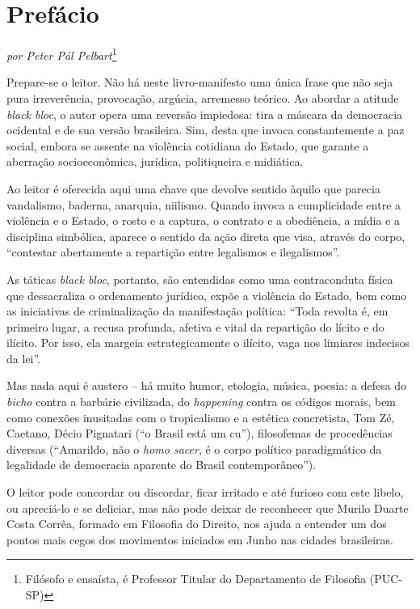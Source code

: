 \chapter{Prefácio}

\begin{flushright}
\emph{por Peter Pál Pelbart}\footnote{Filósofo e ensaísta, é
Professor Titular do Departamento de Filosofia (PUC-SP)}
\end{flushright}

Prepare-se o leitor. Não há neste livro-manifesto uma única frase que
não seja pura irreverência, provocação, argúcia, arremesso teórico. Ao
abordar a atitude \emph{black bloc}, o autor opera uma reversão
impiedosa: tira a máscara da democracia ocidental e de sua versão
brasileira. Sim, desta que invoca constantemente a paz social, embora se
assente na violência cotidiana do Estado, que garante a aberração
socioeconômica, jurídica, politiqueira e midiática.

Ao leitor é oferecida aqui uma chave que devolve sentido àquilo que
parecia vandalismo, baderna, anarquia, niilismo\emph{.} Quando invoca a
cumplicidade entre a violência e o Estado, o rosto e a captura, o
contrato e a obediência, a mídia e a disciplina simbólica, aparece o
sentido da ação direta que visa, através do corpo, ``contestar
abertamente a repartição entre legalismos e ilegalismos''.

As táticas \emph{black bloc}, portanto, são entendidas como uma
contraconduta física que dessacraliza o ordenamento jurídico, expõe a
violência do Estado, bem como as iniciativas de criminalização da
manifestação política: ``Toda revolta é, em primeiro lugar, a recusa
profunda, afetiva e vital da repartição do lícito e do ilícito. Por
isso, ela margeia estrategicamente o ilícito, vaga nos limiares
indecisos da lei''.

Mas nada aqui é austero -- há muito humor, etologia, música, poesia: a
defesa do \emph{bicho} contra a barbárie civilizada, do \emph{happening
}contra os códigos morais, bem como conexões inusitadas com o
tropicalismo e a estética concretista, Tom Zé, Caetano, Décio Pignatari
(``o Brasil está um cu''), filosofemas de procedências diversas
(``Amarildo, não o \emph{homo sacer}, é o corpo político paradigmático
da legalidade de democracia aparente do Brasil contemporâneo'').

O leitor pode concordar ou discordar, ficar irritado e até furioso com
este libelo, ou apreciá-lo e se deliciar, mas não pode deixar de
reconhecer que Murilo Duarte Costa Corrêa, formado em Filosofia do
Direito, nos ajuda a entender um dos pontos mais cegos dos movimentos
iniciados em Junho nas cidades brasileiras.

